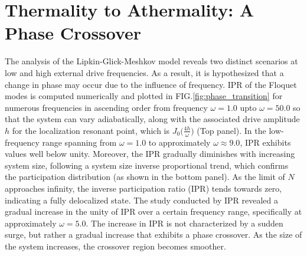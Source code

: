 \documentclass[%
reprint,
superscriptaddress,
amsmath,amssymb,
aps,
prb,
showkeys,
]{revtex4-2}
\begin{document}
	\section{\label{sec:level5}Thermality to Athermality: A Phase Crossover}
	The analysis of the Lipkin-Glick-Meshkov model reveals two distinct scenarios at low and high external drive frequencies. As a result, it is hypothesized that a change in phase may occur due to the influence of frequency. IPR of the Floquet modes is computed numerically and plotted in FIG.\ref{fig:phase_transition} for numerous frequencies in ascending order from frequency $\omega = 1.0$ upto $\omega=50.0$ so that the system can vary adiabatically, along with the associated drive amplitude $h$ for the localization resonant point, which is $J_0\big(\frac{4h}{\omega}\big)$ (Top panel). In the low-frequency range spanning from $\omega = 1.0$ to approximately $\omega \approx 9.0$, IPR exhibits values well below unity. Moreover, the IPR gradually diminishes with increasing system size, following a system size inverse proportional trend, which confirms the participation distribution (as shown in the bottom panel). As the limit of $N$ approaches infinity, the inverse participation ratio (IPR) tends towards zero, indicating a fully delocalized state. The study conducted by IPR revealed a gradual increase in the unity of IPR over a certain frequency range, specifically at approximately $\omega = 5.0$. The increase in IPR is not characterized by a sudden surge, but rather a gradual increase that exhibits a phase crossover\cite{sierant_2023, sachdev_quantum_2011}. As the size of the system increases, the crossover region becomes smoother.
	
\end{document}
